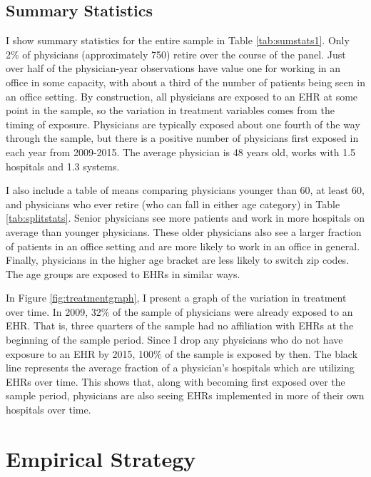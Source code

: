 \documentclass[11pt]{article}
\begin{document}
\subsection{Summary Statistics}

I show summary statistics for the entire sample in Table \ref{tab:sumstats1}. Only 2\% of physicians (approximately 750) retire over the course of the panel. Just over half of the physician-year observations have value one for working in an office in some capacity, with about a third of the number of patients being seen in an office setting. By construction, all physicians are exposed to an EHR at some point in the sample, so the variation in treatment variables comes from the timing of exposure. Physicians are typically exposed about one fourth of the way through the sample, but there is a positive number of physicians first exposed in each year from 2009-2015. The average physician is 48 years old, works with 1.5 hospitals and 1.3 systems. 


I also include a table of means comparing physicians younger than 60, at least 60, and physicians who ever retire (who can fall in either age category) in Table \ref{tab:splitstats}. Senior physicians see more patients and work in more hospitals on average than younger physicians. These older physicians also see a larger fraction of patients in an office setting and are more likely to work in an office in general. Finally, physicians in the higher age bracket are less likely to switch zip codes. The age groups are exposed to EHRs in similar ways.


In Figure \ref{fig:treatmentgraph}, I present a graph of the variation in treatment over time. In 2009, 32\% of the sample of physicians were already exposed to an EHR. That is, three quarters of the sample had no affiliation with EHRs at the beginning of the sample period. Since I drop any physicians who do not have exposure to an EHR by 2015, 100\% of the sample is exposed by then. The black line represents the average fraction of a physician's hospitals which are utilizing EHRs over time. This shows that, along with becoming first exposed over the sample period, physicians are also seeing EHRs implemented in more of their own hospitals over time.


\section{Empirical Strategy}
\end{document}
